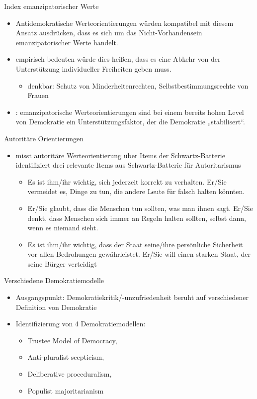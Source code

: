\documentclass[11pt]{beamer}
\begin{document}
\begin{frame}{Index emanzipatorischer Werte \parencite[71]{Welzel2013}}
	\begin{itemize}
		\item Antidemokratische Werteorientierungen würden kompatibel mit diesem Ansatz ausdrücken, dass es sich um das Nicht-Vorhandensein emanzipatorischer Werte handelt.
		\item empirisch bedeuten würde dies heißen, dass es eine Abkehr von der Unterstützung individueller Freiheiten geben muss.
		\begin{itemize}
			\item denkbar: Schutz von Minderheitenrechten, Selbstbestimmungsrechte von Frauen
		\end{itemize}
		\item \cite[399]{Welzel2007}: emanzipatorische Werteorientierungen sind bei einem bereits hohen Level von Demokratie ein Unterstützungsfaktor, der die Demokratie „stabilisert“.
	\end{itemize}
\end{frame}

\begin{frame}{Autoritäre Orientierungen}
	\begin{itemize}
		\item \cite{Spier2010} misst autoritäre Werteorientierung über Items der Schwartz-Batterie identifiziert drei relevante Items aus Schwartz-Batterie für Autoritarismus
		\begin{itemize}
			\item Es ist ihm/ihr wichtig, sich jederzeit korrekt zu verhalten. Er/Sie vermeidet es, Dinge zu tun, die andere Leute für falsch halten könnten.
			\item Er/Sie glaubt, dass die Menschen tun sollten, was man ihnen sagt. Er/Sie denkt, dass Menschen sich immer an Regeln halten sollten, selbst dann, wenn es niemand sieht.
			\item Es ist ihm/ihr wichtig, dass der Staat seine/ihre persönliche Sicherheit vor allen Bedrohungen gewährleistet. Er/Sie will einen starken Staat, der seine Bürger verteidigt
		\end{itemize}
	\end{itemize}
\end{frame}

\begin{frame}{Verschiedene Demokratiemodelle}
	\begin{itemize}
		\item Ausgangspunkt: Demokratiekritik/-unzufriedenheit beruht auf verschiedener Definition von Demokratie
		\item Identifizierung von 4 Demokratiemodellen:
		\begin{itemize}
			\item Trustee Model of Democracy,
			\item Anti-pluralist scepticism,
			\item Deliberative proceduralism,
			\item Populist majoritarianism \parencite[792]{Landwehr2017}
		\end{itemize}
	\end{itemize}
\end{frame}
\end{document}
